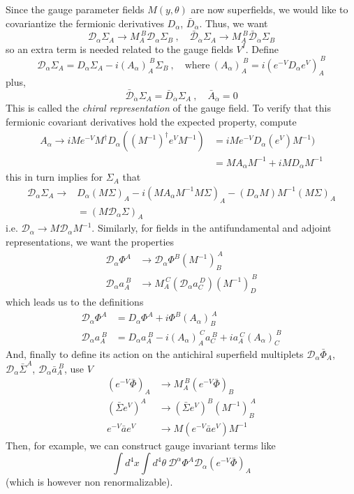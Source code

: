 \documentclass[a4paper,12pt]{article}
\numberwithin{equation}{section}
\numberwithin{exe}{section}
\newcommand{\Db}{{\bar D}}
\newcommand{\Dc}{{\mathcal D}}
\newcommand{\Dcb}{{\bar{\mathcal D}}}
\renewcommand{\a}{{\alpha}}
\newcommand{\ad}{{\dot\alpha}}
\renewcommand{\S}{{\Sigma}}
\newcommand{\Sb}{{\bar\Sigma}}
\renewcommand{\t}{{\theta}}
\newcommand{\Phib}{{\bar \Phi}}
\begin{document}
Since the gauge parameter fields $M(y,\t)$ are now superfields, we would like to covariantize the fermionic derivatives $D_\a$, $\Db_\ad$. Thus, we want
	\begin{equation}
	\Dc_\a \S_A\rightarrow M_A^{\ B} \Dc_\a \S_B\ ,\quad \Dcb_\ad\S_A \rightarrow M_A^{\ B}\Dcb_\ad\S_B
	\end{equation}
so an extra term is needed related to the gauge fields $V^I$. Define
	\begin{equation}
	\Dc_\a\S_A = D_\a\S_A -i(A_\a)_A^{\ B}\S_B\ ,\quad\text{where}\ (A_\a)_A^{\ B} = i(e^{-V} D_\a e^V)_A^{\ B}
	\end{equation}
plus,
	\begin{equation}
	\Dcb_\ad\S_A = \Db_\ad\S_A\ ,\quad \bar A_\ad = 0
	\end{equation}
This is called the {\it chiral representation} of the gauge field. To verify that this fermionic covariant derivatives hold the expected property, compute
	\begin{align}
	A_\a \rightarrow iMe^{-V} M^\dagger D_\a((M^{-1})^\dagger e^V M^{-1}) & = iMe^{-V} D_\a(e^V) M^{-1}) \nonumber \\
	& = M A_\a M^{-1} + i M D_\a M^{-1}
	\end{align}
this in turn implies for $\S_A$ that
	\begin{align}
	\Dc_\a\S_A \rightarrow & D_\a(M\S)_A - i(M A_\a M^{-1} M \S)_A - (D_\a M) M^{-1} (M\S)_A \nonumber \\
	& = (M\Dc_\a\S)_A
	\end{align}
i.e. $\Dc_\a \rightarrow M \Dc_\a M^{-1}$. Similarly, for fields in the antifundamental and adjoint representations, we want the properties
	\begin{align}
	\Dc_\a\Phi^A &\rightarrow \Dc_\a\Phi^B (M^{-1})_B^{\ A} \\
	\Dc_\a a_A^{\ B} & \rightarrow M_A^{\ C} (\Dc_\a a_C^{\ D})(M^{-1})_D^{\ B}
	\end{align}
which leads us to the definitions
	\begin{align}
	\Dc_\a\Phi^A & = D_\a \Phi^A + i\Phi^B (A_\a)_B^{\ A} \\
	\Dc_\a a_A^{\ B} & = D_\a a_A^{\ B} - i(A_\a)_A^{\ C} a_C^{\ B} + i a_A^{\ C} (A_\a)_C^{\ B}
	\end{align}
And, finally to define its action on the antichiral superfield multiplets $\Dc_\a\Phib_A$, $\Dc_\a \Sb^A$, $\Dc_\a \bar a_A^{\ B}$, use $V$
	\begin{align}
	(e^{-V} \Phib)_A & \rightarrow M_A^{\ B} (e^{-V} \Phib)_B \nonumber \\
	(\Sb e^V)^A & \rightarrow (\Sb e^V)^B (M^{-1})_B^{\ A} \\
	e^{-V}\bar a e^V & \rightarrow M(e^{-V} \bar a e^V) M^{-1}\nonumber
	\end{align}
Then, for example, we can construct gauge invariant terms like
	\begin{equation}
	\int d^4 x \int d^4\t\ \Dc^\a \Phi^A \Dc_\a(e^{-V} \Phib)_A
	\end{equation}
(which is however non renormalizable).
\end{document}
